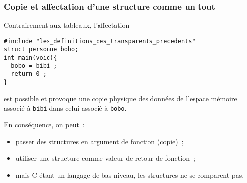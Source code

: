 \begin{frame}[fragile]
  \frametitle{Copie et affectation d'une structure comme un tout}%
Contrairement aux tableaux, l'affectation
\begin{verbatim}
#include "les_definitions_des_transparents_precedents"
struct personne bobo;
int main(void){
  bobo = bibi ;
  return 0 ;
}
\end{verbatim}
est possible et provoque une copie physique des donn\'ees de l'espace
m\'emoire associ\'e \`a \texttt{bibi} dans celui associ\'e \`a
\texttt{bobo}.
\par\medskip
En cons\'equence, on peut~:
\begin{itemize}
\item passer des structures en argument de fonction (copie)~;
\item utiliser une structure comme valeur de retour de fonction~;
\item mais C \'etant un langage de bas niveau, les structures ne se
  comparent pas.
\end{itemize}
\end{frame}
